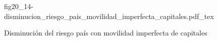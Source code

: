 \begin{figure}[h]
\centering
\def\svgwidth{0.5\textwidth}
{fig20_14-disminucion_riesgo_pais_movilidad_imperfecta_capitales.pdf_tex}
\caption{Disminución del riesgo país con movilidad imperfecta de capitales}
\label{fig20_14-disminucion_riesgo_pais_movilidad_imperfecta_capitales}
\end{figure}
